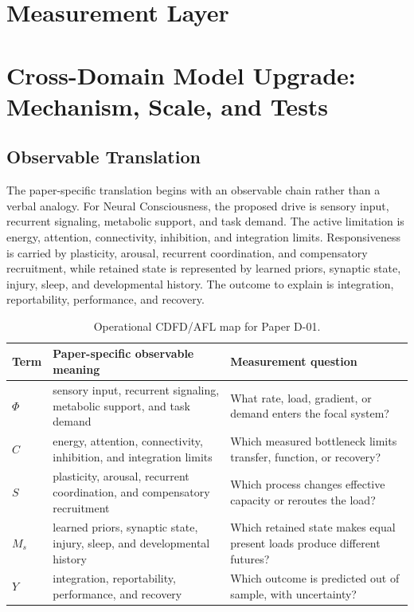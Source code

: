 \documentclass[11pt,a4paper]{article}
\begin{document}
\section{Measurement Layer}

\section{Cross-Domain Model Upgrade: Mechanism, Scale, and Tests}

\subsection{Observable Translation}

The paper-specific translation begins with an observable chain rather than a
verbal analogy. For Neural Consciousness, the proposed drive is sensory input, recurrent signaling, metabolic support, and task demand.
The active limitation is energy, attention, connectivity, inhibition, and integration limits. Responsiveness is carried by
plasticity, arousal, recurrent coordination, and compensatory recruitment, while retained state is represented by
learned priors, synaptic state, injury, sleep, and developmental history. The outcome to explain is integration, reportability, performance, and recovery.

\begin{table}[htbp]
\centering
\small
\caption{Operational CDFD/AFL map for Paper D-01.}
\begin{tabularx}{\textwidth}{|l|X|X|}
\hline
\textbf{Term} & \textbf{Paper-specific observable meaning} & \textbf{Measurement question} \\
\hline
$\Phi$ & sensory input, recurrent signaling, metabolic support, and task demand & What rate, load, gradient, or demand enters the focal system? \\
\hline
$C$ & energy, attention, connectivity, inhibition, and integration limits & Which measured bottleneck limits transfer, function, or recovery? \\
\hline
$S$ & plasticity, arousal, recurrent coordination, and compensatory recruitment & Which process changes effective capacity or reroutes the load? \\
\hline
$M_s$ & learned priors, synaptic state, injury, sleep, and developmental history & Which retained state makes equal present loads produce different futures? \\
\hline
$Y$ & integration, reportability, performance, and recovery & Which outcome is predicted out of sample, with uncertainty? \\
\hline
\end{tabularx}
\end{table}
\end{document}
